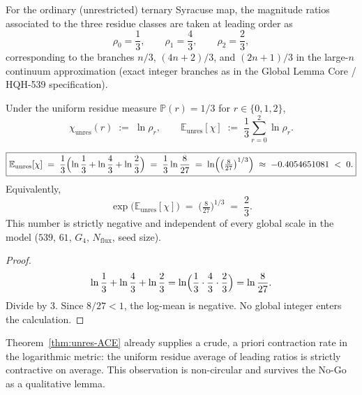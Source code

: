 \begin{definition}
\label{def:ratios}
For the ordinary (unrestricted) ternary Syracuse map, the magnitude ratios
associated to the three residue classes are taken at leading order as
\begin{equation}
\label{eq:ratios}
\rho_0=\frac13,
\qquad
\rho_1=\frac43,
\qquad
\rho_2=\frac23,
\end{equation}
corresponding to the branches \(n/3\), \((4n+2)/3\), and \((2n+1)/3\) in the
large-\(n\) continuum approximation (exact integer branches as in the Global
Lemma Core / HQH-539 specification).
\end{definition}

\begin{definition}
\label{def:chi-unres}
Under the uniform residue measure \(\mathbb{P}(r)=1/3\) for \(r\in\{0,1,2\}\),
\begin{equation}
\label{eq:chi-unres}
\chi_{\mathrm{unres}}(r)
\;:=\;
\ln\rho_r,
\qquad
\mathbb{E}_{\mathrm{unres}}[\chi]
\;:=\;
\frac13\sum_{r=0}^{2}\ln\rho_r.
\end{equation}
\end{definition}

\begin{theorem}
\label{thm:unres-ACE}
\begin{equation}
\boxed{
\mathbb{E}_{\mathrm{unres}}[\chi]
\;=\;
\frac13\Bigl(
\ln\frac13+\ln\frac43+\ln\frac23
\Bigr)
\;=\;
\frac13\ln\frac{8}{27}
\;=\;
\ln\Bigl(\bigl(\tfrac{8}{27}\bigr)^{1/3}\Bigr)
\;\approx\;
-0.4054651081
\;<\;0.
}
\label{eq:unres}
\end{equation}
Equivalently,
\[
\exp\bigl(\mathbb{E}_{\mathrm{unres}}[\chi]\bigr)
\;=\;
\bigl(\tfrac{8}{27}\bigr)^{1/3}
\;=\;
\frac23.
\]
This number is strictly negative and independent of every global scale in the
model (\(539\), \(61\), \(G_4\), \(N_{\mathrm{flux}}\), seed size).
\end{theorem}

\begin{proof}
\[
\ln\frac13+\ln\frac43+\ln\frac23
=
\ln\Bigl(\frac13\cdot\frac43\cdot\frac23\Bigr)
=
\ln\frac{8}{27}.
\]
Divide by \(3\). Since \(8/27<1\), the log-mean is negative. No global integer
enters the calculation.
\end{proof}

\begin{corollary}
\label{cor:crude}
Theorem~\ref{thm:unres-ACE} already supplies a crude, a priori contraction rate
in the logarithmic metric: the uniform residue average of leading ratios is
strictly contractive on average. This observation is non-circular and survives
the No-Go as a qualitative lemma.
\end{corollary}

